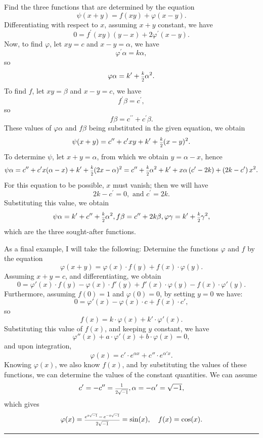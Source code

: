 \documentclass[oneside, 12 pt, leqno]{memoir}
\let\oldfrac\frac
\def\frac#1#2{\mathchoice{\text{\scalebox{.83}{${\oldfrac{#1}{#2}}$}}}{\text{\scalebox{.83}{${\displaystyle\oldfrac{#1}{#2}}$}}}{\genfrac{}{}{}{2}{#1}{#2}}{\genfrac{}{}{}{3}{#1}{#2}}}
\begin{document}
Find the three functions that are determined by the equation
\[\psi(x+y)=f(x y)+\varphi(x-y). \]
Differentiating with respect to \(x\), assuming \(x+y\) constant, we have
\[0=f^{\prime}(x y)(y-x)+2 \varphi^{\prime}(x-y).\]
Now, to find \(\varphi\), let \(x y=c\) and \(x-y=\alpha\), we have
\[\varphi^{\prime} \alpha=k \alpha,\]
so
\[\varphi \alpha=k^{\prime}+\frac{k}{2} \alpha^2.\]
To find \(f\), let \(x y=\beta\) and \(x-y=c\), we have
\[f^{\prime} \beta=c^{\prime},\]
so
\[f \beta=c^{\prime \prime}+c^{\prime} \beta.\]
These values of \(\varphi \alpha\) and \(f \beta\) being substituted in the given equation, we obtain
\[\psi(x+y)=c^{\prime \prime}+c^{\prime} x y+k^{\prime}+\frac{k}{2}(x-y)^2.\]
To determine \(\psi\), let \(x+y=\alpha\), from which we obtain \(y=\alpha-x\), hence
\[\psi \alpha=c^{\prime \prime}+c^{\prime} x(\alpha-x)+k^{\prime}+\frac{k}{2}(2 x-\alpha)^2=c^{\prime \prime}+\frac{k}{2} \alpha^2+k^{\prime}+x \alpha\left(c^{\prime}-2 k\right)+\left(2 k-c^{\prime}\right) x^2.\]
For this equation to be possible, \(x\) must vanish; then we will have
\[2 k-c^{\prime}=0, \text { and } c^{\prime}=2 k.\]
Substituting this value, we obtain
\[\psi \alpha=k^{\prime}+c^{\prime \prime}+\frac{k}{2} \alpha^2, f \beta=c^{\prime \prime}+2 k \beta, \varphi \gamma=k^{\prime}+\frac{k}{2} \gamma^2,\]
which are the three sought-after functions. 

As a final example, I will take the following: Determine the functions \(\varphi\) and \(f\) by the equation
\[\varphi(x+y)=\varphi(x) \cdot f(y)+f(x) \cdot \varphi(y).\]
Assuming \(x+y=c\), and differentiating, we obtain
\[0=\varphi'(x) \cdot f(y)-\varphi(x) \cdot f'(y)+f'(x) \cdot \varphi(y)-f(x) \cdot \varphi'(y).\]
Furthermore, assuming \(f(0)=1\) and \(\varphi(0)=0\), by setting \(y=0\) we have:
\[0=\varphi'(x)-\varphi(x) \cdot c+f(x) \cdot c',\]
so
\[f(x)= k \cdot \varphi(x)+k' \cdot \varphi'(x).\]
Substituting this value of \(f(x)\), and keeping \(y\) constant, we have
\[\varphi''(x)+a \cdot \varphi'(x)+b \cdot \varphi(x)=0,\]
and upon integration,
\[\varphi(x)=c' \cdot e^{\alpha x}+c'' \cdot e^{\alpha' x}.\]
Knowing \(\varphi(x)\), we also know \(f(x)\), and by substituting the values of these functions, we can determine the values of the constant quantities. We can assume
\[c'=-c''=\frac{1}{2 \sqrt{-1}}, \alpha=-\alpha'=\sqrt{-1},\]
which gives
\[\varphi(x)=\frac{e^{x \sqrt{-1}}-e^{-x \sqrt{-1}}}{2 \sqrt{-1}}=\sin(x), \quad f(x)=\cos(x).\]
\begin{center}
\rule{2in}{0.1pt}
\end{center}
\end{document}
